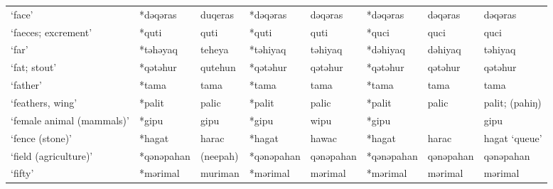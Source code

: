 \begin{landscape}
\begin{longtable}[c]{@{}p{3cm}<{\raggedright}p{2.75cm}<{\raggedright}p{2.75cm}<{\raggedright}p{2.75cm}<{\raggedright}p{2.75cm}<{\raggedright}p{2.75cm}<{\raggedright}p{2.75cm}<{\raggedright}p{2.75cm}<{\raggedright}@{}}
`face'                                               & *dəqəras           & duqeras                        & *dəqəras           & dəqəras                    & *dəqəras         & dəqəras                  & dəqəras                           \\
`faeces; excrement'                                  & *quti              & quti                           & *quti              & quti                       & *quci            & quci                     & quci                              \\
`far'                                                & *təhəyaq           & teheya                         & *təhiyaq           & təhiyaq                    & *dəhiyaq         & dəhiyaq                  & təhiyaq                           \\
`fat; stout'                                         & *qətəhur           & qutehun                        & *qətəhur           & qətəhur                    & *qətəhur         & qətəhur                  & qətəhur                           \\
`father'                                             & *tama              & tama                           & *tama              & tama                       & *tama            & tama                     & tama                              \\
`feathers, wing'                                     & *palit             & palic                          & *palit             & palic                      & *palit           & palic                    & palit; (pahiŋ)                    \\
`female animal (mammals)'                            & *gipu              & gipu                           & *gipu              & wipu                       & *gipu            &                          & gipu                              \\
`fence (stone)'                                      & *hagat             & harac                          & *hagat             & hawac                      & *hagat           & harac                    & hagat `queue'                     \\
`field (agriculture)'                                & *qənəpahan         & (neepah)                       & *qənəpahan         & qənəpahan                  & *qənəpahan       & qənəpahan                & qənəpahan                         \\
`fifty'                                              & *mərimal           & muriman                        & *mərimal           & mərimal                    & *mərimal         & mərimal                  & mərimal                           \\

\end{longtable}
\end{landscape}
